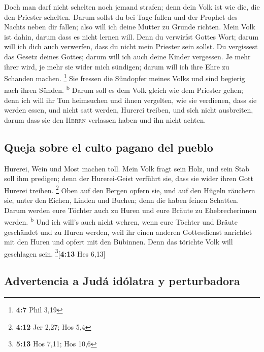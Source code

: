 Doch man darf nicht schelten noch jemand strafen; denn
dein Volk ist wie die, die den Priester schelten.  Darum
sollst du bei Tage fallen und der Prophet des Nachts neben dir fallen;
also will ich deine Mutter zu Grunde richten.  Mein Volk
ist dahin, darum dass es nicht lernen will. Denn du verwirfst Gottes
Wort; darum will ich dich auch verwerfen, dass du nicht mein Priester
sein sollst. Du vergissest das Gesetz deines Gottes; darum will ich auch
deine Kinder vergessen.  Je mehr ihrer wird, je mehr sie
wider mich sündigen; darum will ich ihre Ehre zu Schanden machen.
\footnote{\textbf{4:7} Phil 3,19}  Sie fressen die
Sündopfer meines Volks und sind begierig nach ihren Sünden.
\textsuperscript{b}  Darum soll es dem Volk gleich wie dem
Priester gehen; denn ich will ihr Tun heimsuchen und ihnen vergelten,
wie sie verdienen,  dass sie werden essen, und nicht satt
werden, Hurerei treiben, und sich nicht ausbreiten, darum dass sie den
\textsc{Herrn} verlassen haben und ihn nicht achten.

\hypertarget{queja-sobre-el-culto-pagano-del-pueblo}{%
\subsection{Queja sobre el culto pagano del
pueblo}\label{queja-sobre-el-culto-pagano-del-pueblo}}

 Hurerei, Wein und Most machen toll.  Mein
Volk fragt sein Holz, und sein Stab soll ihm predigen; denn der
Hurerei-Geist verführt sie, dass sie wider ihren Gott Hurerei treiben.
\footnote{\textbf{4:12} Jer 2,27; Hos 5,4}  Oben auf den
Bergen opfern sie, und auf den Hügeln räuchern sie, unter den Eichen,
Linden und Buchen; denn die haben feinen Schatten. Darum werden eure
Töchter auch zu Huren und eure Bräute zu Ehebrecherinnen werden.
\textsuperscript{b}  Und ich will's auch nicht wehren,
wenn eure Töchter und Bräute geschändet und zu Huren werden, weil ihr
einen anderen Gottesdienst anrichtet mit den Huren und opfert mit den
Bübinnen. Denn das törichte Volk will geschlagen sein.
\footnote{\textbf{5:13} Hos 7,11; Hos 10,6}{[}\textbf{4:13} Hes 6,13{]}

\hypertarget{advertencia-a-juduxe1-iduxf3latra-y-perturbadora}{%
\subsection{Advertencia a Judá idólatra y
perturbadora}\label{advertencia-a-juduxe1-iduxf3latra-y-perturbadora}}

